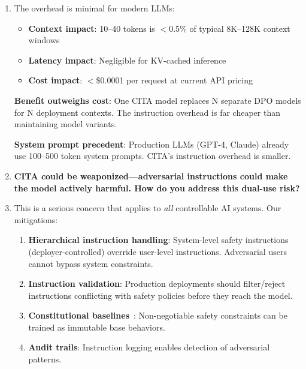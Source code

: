 \begin{enumerate}[label=\textbf{Q\arabic*.}, leftmargin=*, itemsep=8pt]
\item[\ding{224}] The overhead is minimal for modern LLMs:

\begin{itemize}[leftmargin=*,itemsep=2pt]
    \item \textbf{Context impact}: 10--40 tokens is $<$0.5\% of typical 8K--128K context windows
    \item \textbf{Latency impact}: Negligible for KV-cached inference
    \item \textbf{Cost impact}: $<$\$0.0001 per request at current API pricing
\end{itemize}

\textbf{Benefit outweighs cost}: One CITA model replaces N separate DPO models for N deployment contexts. The instruction overhead is far cheaper than maintaining model variants.

\textbf{System prompt precedent}: Production LLMs (GPT-4, Claude) already use 100--500 token system prompts. CITA's instruction overhead is smaller.

\vspace{4mm}

\item[\ding{93}] \textbf{CITA could be weaponized---adversarial instructions could make the model actively harmful. How do you address this dual-use risk?}

\item[\ding{224}] This is a serious concern that applies to \textit{all} controllable AI systems. Our mitigations:

\begin{enumerate}[leftmargin=*,itemsep=2pt]
    \item \textbf{Hierarchical instruction handling}: System-level safety instructions (deployer-controlled) override user-level instructions. Adversarial users cannot bypass system constraints.

    \item \textbf{Instruction validation}: Production deployments should filter/reject instructions conflicting with safety policies before they reach the model.

    \item \textbf{Constitutional baselines}~\cite{bai2022constitutional}: Non-negotiable safety constraints can be trained as immutable base behaviors.

    \item \textbf{Audit trails}: Instruction logging enables detection of adversarial patterns.
\end{enumerate}


\end{enumerate}
